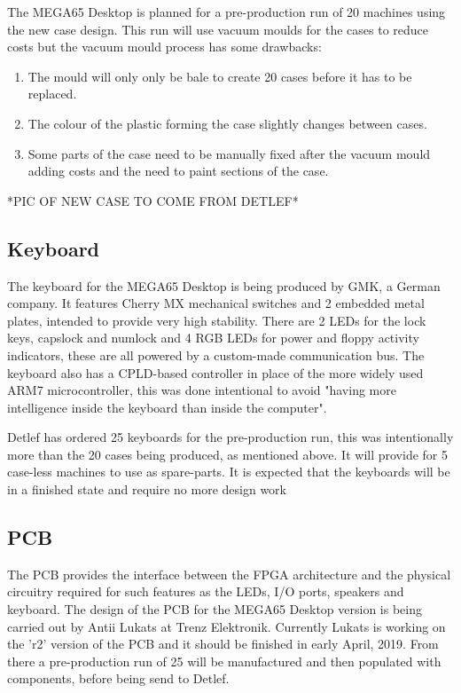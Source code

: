 The MEGA65 Desktop is planned for a pre-production run of 20 machines using the new case design. This run will use vacuum moulds for the cases to reduce costs but the vacuum mould process has some drawbacks: 
\begin{enumerate}
\item The mould will only only be bale to create 20 cases before it has to be replaced.
\item The colour of the plastic forming the case slightly changes between cases.
\item Some parts of the case need to be manually fixed after the vacuum mould adding costs and the need to paint sections of the case.
\end{enumerate}

*PIC OF NEW CASE TO COME FROM DETLEF*

\subsection{Keyboard}
The keyboard for the MEGA65 Desktop is being produced by GMK, a German company. It features Cherry MX mechanical switches and 2 embedded metal plates, intended to provide very high stability. There are 2 LEDs for the lock keys, capslock and numlock and 4 RGB LEDs for power and floppy activity indicators, these are all powered by a custom-made communication bus. The keyboard also has a CPLD-based controller in place of the more widely used ARM7 microcontroller, this was done intentional to avoid "having more intelligence inside the keyboard than inside the computer".

Detlef has ordered 25 keyboards for the pre-production run, this was intentionally more than the 20 cases being produced, as mentioned above. It will provide for 5 case-less machines to use as spare-parts. It is expected that the keyboards will be in a finished state and require no more design work 

\subsection{PCB}
The PCB provides the interface between the FPGA architecture and the physical circuitry required for such features as the LEDs, I/O ports, speakers and keyboard. The design of the PCB for the MEGA65 Desktop version is being carried out by Antii Lukats at Trenz Elektronik. Currently Lukats is working on the 'r2' version of the PCB and it should be finished in early April, 2019. From there a pre-production run of 25 will be manufactured and then populated with components, before being send to Detlef. 

